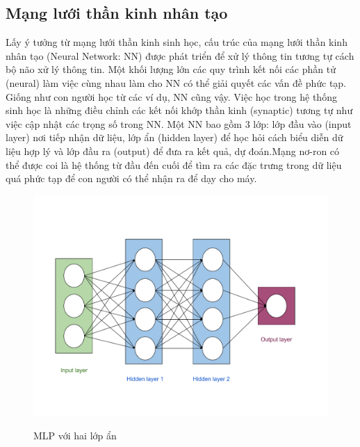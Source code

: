 \subsection{Mạng lưới thần kinh nhân tạo}
Lấy ý tưởng từ mạng lưới thần kinh sinh học, cấu trúc của mạng lưới thần kinh nhân tạo (Neural Network: NN) được phát triển để xử lý thông tin tương tự cách bộ não xử lý thông tin. Một khối lượng lớn các quy trình kết nối các phần tử (neural) làm việc cùng nhau làm cho NN có thể giải quyết các vấn đề phức tạp. Giống như con người học từ các ví dụ, NN cũng vậy. Việc học trong hệ thống sinh học là những điều chỉnh các kết nối khớp thần kinh (synaptic) tương tự như việc cập nhật các trọng số trong NN.
Một NN bao gồm 3 lớp: lớp đầu vào (input layer) nơi tiếp nhận dữ liệu, lớp ẩn (hidden layer) để học hỏi cách biểu diễn dữ liệu hợp lý và lớp đầu ra (output) để đưa ra kết quả, dự đoán.Mạng nơ-ron có thể được coi là hệ thống từ đầu đến cuối để tìm ra các đặc trưng trong dữ liệu quá phức tạp để con người có thể nhận ra để dạy cho máy.
\begin{figure}[h]
	\begin{center}
		\includegraphics[height=.58\textheight]{Chuong2/Figs/MLP.pdf}
		\label{fig:Two Layered Neural Network}
		\caption{MLP với hai lớp ẩn}
	\end{center}
\end{figure}

